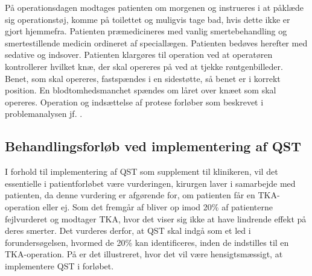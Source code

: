 På operationsdagen modtages patienten om morgenen og instrueres i at påklæde sig operationstøj, komme på toilettet og muligvis tage bad, hvis dette ikke er gjort hjemmefra. Patienten præmedicineres med vanlig smertebehandling og smertestillende medicin ordineret af speciallægen. Patienten bedøves herefter med sedative og indsover. Patienten klargøres til operation ved at operatøren kontrollerer hvilket knæ, der skal opereres på ved at tjekke røntgenbilleder. Benet, som skal opereres, fastspændes i en sidestøtte, så benet er i korrekt position. En blodtomhedsmanchet spændes om låret over knæet som skal opereres. Operation og indsættelse af protese forløber som beskrevet i problemanalysen jf. . \citep{pritka2015} \\




\subsection{Behandlingsforløb ved implementering af QST}
I forhold til implementering af QST som supplement til klinikeren, vil det essentielle i patientforløbet være vurderingen, kirurgen laver i samarbejde med patienten, da denne vurdering er afgørende for, om patienten får en TKA-operation eller ej. Som det fremgår af  bliver op imod 20\% af patienterne fejlvurderet og modtager TKA, hvor det viser sig ikke at have lindrende effekt på deres smerter. Det vurderes derfor, at QST skal indgå som et led i forundersøgelsen, hvormed de 20\% kan identificeres, inden de indstilles til en TKA-operation. På  er det illustreret, hvor det vil være hensigtsmæssigt, at implementere QST i forløbet. 



